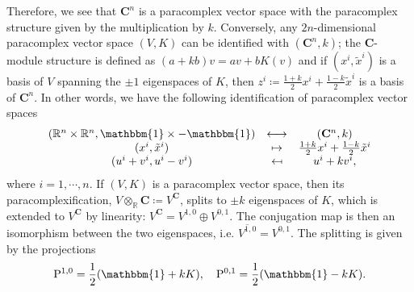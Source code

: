 \documentclass[letterpaper,12pt]{article}
\newcommand{\Cc}{\mathbf{C}}
\newcommand{\RR}{\mathbb{R}}
\newcommand{\PP}{\mathrm{P}}
\newcommand{\id}{\mathbbm{1}}
\newcommand{\xt}{{\tilde{x}}}
\theoremstyle{definition}
\theoremstyle{remark}
\theoremstyle{examples}
\begin{document}
Therefore, we see that $\mathbf{C}^n$ is a paracomplex vector space with the paracomplex structure given by the multiplication by $k$. Conversely, any $2n$-dimensional paracomplex vector space $(V,K)$ can be identified with $(\mathbf{C}^n,k)$; the $\mathbf{C}$-module structure is defined as $(a+kb)v=av+bK(v)$ and if $(x^i, \xt^i)$ is a basis of $V$ spanning the $\pm 1$ eigenspaces of $K$, then $z^i\coloneqq \frac{1+k}{2}x^i+\frac{1-k}{2}\xt^i$ is a basis of $\Cc^n$. In other words, we have the following identification of paracomplex vector spaces
\begin{align}\label{para-complexification}
\begin{aligned}
\begin{array}{ccc}
(\RR^n\times\RR^n,\id \times -\id) &\longleftrightarrow &(\Cc^n, k)\\
(x^i,\xt^i) &\mapsto &\frac{1+k}{2}x^i+\frac{1-k}{2}\xt^i\\
(u^i+v^i,u^i-v^i) &\mapsfrom &u^i+kv^i,
\end{array}
\end{aligned}
\end{align}
where $i=1,\cdots,n$. If $(V,K)$ is a paracomplex vector space, then its paracomplexification, $V\otimes_\mathbb{R} \mathbf{C}\coloneqq V^\Cc$, splits to $\pm k$ eigenspaces of $K$, which is extended to $V^\Cc$ by linearity: $V^\Cc=V^{1,0}\oplus V^{0,1}$. The conjugation map is then an isomorphism between the two eigenspaces, i.e. $\overline{{V^{1,0}}}=V^{0,1}$. The splitting is given by the projections
\begin{align}
\PP^{1,0}=\frac{1}{2}(\id +kK),\quad \PP^{0,1}=\frac{1}{2}(\id -kK). \label{eq:projections_parac}
\end{align}
\end{document}
